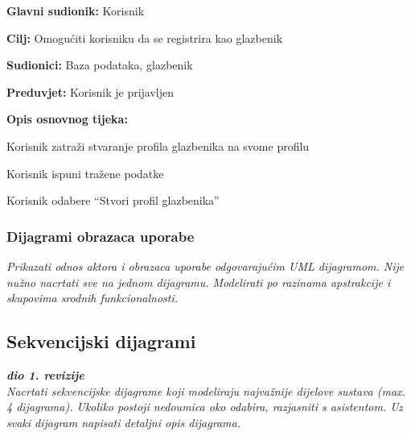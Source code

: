 			\noindent {}
			\begin{packed_item}
				
				\item \textbf{Glavni sudionik: } Korisnik
				\item  \textbf{Cilj:} Omogućiti korisniku da se registrira kao glazbenik 
				\item  \textbf{Sudionici:} Baza podataka, glazbenik
				\item  \textbf{Preduvjet:} Korisnik je prijavljen
				\item  \textbf{Opis osnovnog tijeka:} 
				
				\item[] \begin{packed_enum}
					
					\item Korisnik zatraži stvaranje profila glazbenika na svome profilu
					\item Korisnik ispuni tražene podatke
					\item Korisnik odabere “Stvori profil glazbenika”
			
				\end{packed_enum}
			\end{packed_item}		 
		
		
				
				\subsubsection{Dijagrami obrazaca uporabe}
				
				
				
					
					\textit{Prikazati odnos aktora i obrazaca uporabe odgovarajućim UML dijagramom. Nije nužno nacrtati sve na jednom dijagramu. Modelirati po razinama apstrakcije i skupovima srodnih funkcionalnosti.}
				\eject				
				
				
			\subsection{Sekvencijski dijagrami}
				
				\textbf{\textit{dio 1. revizije}}\\
				
				\textit{Nacrtati sekvencijske dijagrame koji modeliraju najvažnije dijelove sustava (max. 4 dijagrama). Ukoliko postoji nedoumica oko odabira, razjasniti s asistentom. Uz svaki dijagram napisati detaljni opis dijagrama.}
				\eject
	
